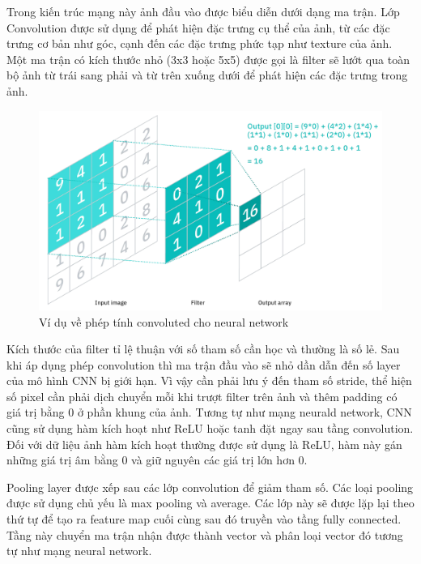 Trong kiến trúc mạng này ảnh đầu vào được biểu diễn dưới dạng ma trận. Lớp Convolution được sử dụng để phát hiện đặc trưng cụ thể của ảnh, từ các đặc trưng cơ bản như góc, cạnh đến các đặc trưng phức tạp như texture của ảnh. Một ma trận có kích thước nhỏ (3x3 hoặc 5x5) được gọi là filter sẽ lướt qua toàn bộ ảnh từ trái sang phải và từ trên xuống dưới để phát hiện các đặc trưng trong ảnh. 

\begin{figure}

    \includegraphics[width=\textwidth]{images/Quanh/cnn.png}
    \caption{Ví dụ về phép tính convoluted cho neural network}
\end{figure}

Kích thước của filter tỉ lệ thuận với số tham số cần học và thường là số lẻ. Sau khi áp dụng phép convolution thì ma trận đầu vào sẽ nhỏ dần dẫn đến số layer của mô hình CNN bị giới hạn. Vì vậy cần phải lưu ý đến tham số stride, thể hiện số pixel cần phải dịch chuyển mỗi khi trượt filter trên ảnh và thêm padding có giá trị bằng 0 ở phần khung của ảnh. Tương tự như mạng neurald network, CNN cũng sử dụng hàm kích hoạt như ReLU hoặc tanh đặt ngay sau tầng convolution. Đối với dữ liệu ảnh hàm kích hoạt thường được sử dụng là ReLU, hàm này gán những giá trị âm bằng 0 và giữ nguyên các giá trị lớn hơn 0.

Pooling layer được xếp sau các lớp convolution để giảm tham số. Các loại pooling được sử dụng chủ yếu là max pooling và average. Các lớp này sẽ được lặp lại theo thứ tự để tạo ra feature map cuối cùng sau đó truyền vào tầng fully connected. Tầng này chuyển ma trận nhận được thành vector và phân loại vector đó tương tự như mạng neural network.

